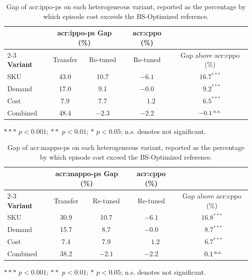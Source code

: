 \begin{table}[ht]
\centering
\small
\renewcommand{\arraystretch}{1.2}
\caption[Heterogeneous performance gap (IPPO-PS)]{Gap of
\gls{acr:ippo-ps} on each heterogeneous variant, reported as the percentage by
which episode cost exceeds the BS-Optimized reference.}
\label{tab:het-gap-ippo}
\begin{tabular}{@{}l c c c c@{}}
\toprule
 & \multicolumn{2}{c}{\gls{acr:ippo-ps} Gap (\%)} & \gls{acr:cppo} (\%) & \\
\cmidrule(lr){2-3}
\textbf{Variant} & Transfer & Re-tuned & Re-tuned & Gap above \gls{acr:cppo} (\%) \\
\midrule
SKU      & 43.0 & 10.7 & $-6.1$ & $16.7^{***}$\\
Demand   & 17.0 &  9.1 & $-0.0$ & $\phantom{0}9.2^{***}$\\
Cost     &  7.9 &  7.7 & $\phantom{-}1.2$ & $\phantom{0}6.5^{***}$\\
Combined & 48.4 & $-2.3$ & $-2.2$ & $-0.1^{\text{\,n.s.}}$\\
\bottomrule
\end{tabular}

\smallskip
{\footnotesize $*** $ $p < 0.001$; $** $ $p < 0.01$; $* $ $p < 0.05$; n.s. denotes not significant.}
\end{table}


\begin{table}[ht]
\centering
\small
\renewcommand{\arraystretch}{1.2}
\caption[Heterogeneous performance gap (MAPPO-PS)]{Gap of \gls{acr:mappo-ps} on each heterogeneous variant, reported as the
percentage by which episode cost exceed the BS-Optimized reference.}
\label{tab:het-gap}
\begin{tabular}{@{}l c c c c@{}}
\toprule
 & \multicolumn{2}{c}{\gls{acr:mappo-ps} Gap (\%)} & \gls{acr:cppo} (\%) & \\
\cmidrule(lr){2-3}
\textbf{Variant} & Transfer & Re-tuned & Re-tuned & Gap above \gls{acr:cppo} (\%) \\
\midrule
SKU      & 30.9 & 10.7 & $-6.1$ & $16.8^{***}$\\
Demand   & 15.7 &  8.7 & $-0.0$ & $\phantom{0}8.7^{***}$\\
Cost     &  7.4 &  7.9 & $\phantom{-}1.2$ & $\phantom{0}6.7^{***}$\\
Combined & 38.2 & $-2.1$ & $-2.2$ & $\phantom{0}0.1^{\text{\,n.s.}}$\\
\bottomrule
\end{tabular}

\smallskip
{\footnotesize $*** $ $p < 0.001$; $** $ $p < 0.01$; $* $ $p < 0.05$; n.s. denotes not significant.}
\end{table}






















